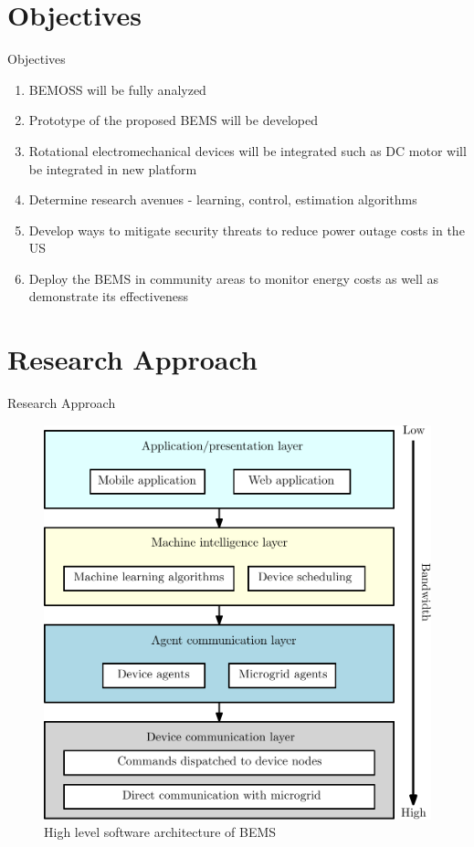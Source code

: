 \documentclass{beamer}
\begin{document}
\section{Objectives}
\begin{frame}{Objectives}
\begin{enumerate}
\item BEMOSS will be fully analyzed 
\item Prototype of the proposed BEMS will be developed
\item Rotational electromechanical devices will be integrated such as DC motor will be integrated in new platform
\item Determine research avenues - learning, control, estimation algorithms
\item Develop ways to mitigate security threats to reduce power outage costs in the US
\item Deploy the BEMS in community areas to monitor energy costs as well as demonstrate its effectiveness
\end{enumerate}
\end{frame}

\section{Research Approach}
\begin{frame}{Research Approach}
\begin{figure}
\includegraphics[scale=0.35]{figs/ipe/BEMS-SoftwareArchitecture}
\caption{High level software architecture of BEMS}
\end{figure}
\end{frame}
\end{document}
